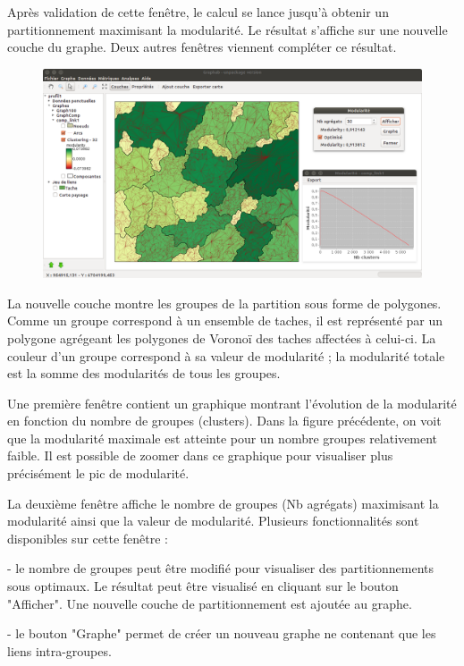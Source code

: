 \documentclass{article}
\begin{document}
Après validation de cette fenêtre, le calcul se lance jusqu'à obtenir un partitionnement maximisant la modularité. Le résultat s'affiche sur une nouvelle couche du graphe. Deux autres fenêtres viennent compléter ce résultat. 

\begin{figure}[H]
	\includegraphics[scale=0.36]{img/manual-fr_cluster.png} 
\end{figure}

La nouvelle couche montre les groupes de la partition sous forme de polygones. Comme un groupe correspond à un ensemble de taches, il est représenté par un polygone agrégeant les polygones de Voronoï des taches affectées à celui-ci. 
La couleur d'un groupe correspond à sa valeur de modularité ; la modularité totale est la somme des modularités de tous les groupes.

Une première fenêtre contient un graphique montrant l'évolution de la modularité en fonction du nombre de groupes (clusters). Dans la figure précédente, on voit que la modularité maximale est atteinte pour un nombre groupes relativement faible. Il est possible de zoomer dans ce graphique pour visualiser plus précisément le pic de modularité.

La deuxième fenêtre affiche le nombre de groupes (Nb agrégats) maximisant la modularité ainsi que la valeur de modularité. Plusieurs fonctionnalités sont disponibles sur cette fenêtre :

{}- le nombre de groupes peut être modifié pour visualiser des partitionnements sous optimaux. Le résultat peut être visualisé en cliquant sur le bouton "Afficher". Une nouvelle couche de partitionnement est ajoutée au graphe.

{}- le bouton "Graphe" permet de créer un nouveau graphe ne contenant que les liens intra-groupes.
\end{document}
